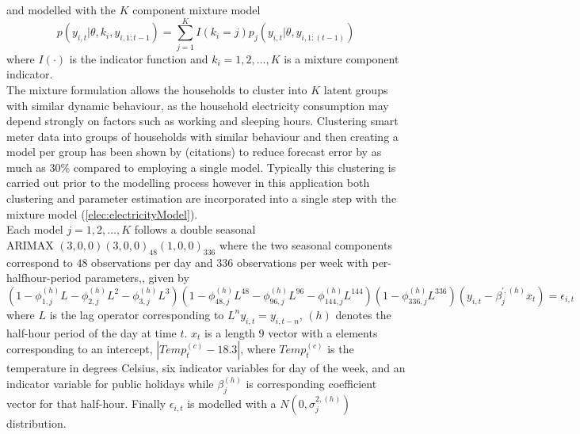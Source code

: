 \documentclass[
12pt, %
onehalfspacing, %
nohyperref, %
headsepline, %
chapterinoneline, %
]{MastersDoctoralThesis} %
\begin{document}
and modelled with the $K$ component mixture model
\begin{equation}
\label{elec:electricityModel}
p(y_{i, t} | \theta, k_i, y_{i, 1:t-1}) = \sum_{j=1}^K I(k_{i} = j) p_{j}(y_{i, t} | \theta, y_{i, 1:(t-1)})
\end{equation}
where $I(\cdot)$ is the indicator function and $k_i = 1, 2, \ldots, K$ is a mixture component indicator.
\\

The mixture formulation allows the households to cluster into $K$ latent groups with similar dynamic behaviour, as the household electricity consumption may depend strongly on factors such as working and sleeping hours. Clustering smart meter data into groups of households with similar behaviour and then creating a model per group has been shown by (citations) to reduce forecast error by as much as 30\% compared to employing a single model. Typically this clustering is carried out prior to the modelling process however in this application both clustering and parameter estimation are incorporated into a single step with the mixture model (\ref{elec:electricityModel}).
\\

Each model $j = 1, 2, \ldots, K$ follows a double seasonal \\ ARIMAX $(3, 0, 0)(3, 0, 0)_{48}(1, 0, 0)_{336}$ where the two seasonal components correspond to $48$ observations per day and $336$ observations per week with per-halfhour-period parameters,, given by
\begin{equation}
\label{elec:dynamic}
(1 - \phi_{1, j}^{(h)}L - \phi_{2, j}^{(h)}L^2 - \phi_{3, j}^{(h)} L^3)(1 - \phi_{48, j}^{(h)}L^{48} - \phi_{96, j}^{(h)}L^{96} - \phi_{144, j}^{(h)}L^{144})(1 - \phi_{336, j}^{(h)}L^{336}) (y_{i, t} -  \beta^{\prime, {(h)}}_{j} x_{t}) = \epsilon_{i, t}
\end{equation}
where $L$ is the lag operator corresponding to $L^n y_{i, t} = y_{i, t- n}$, $(h)$ denotes the half-hour period of the day at time $t$. $x_{t}$ is a length $9$ vector with a elements corresponding to an intercept, $|Temp^{(c)}_{t} - 18.3|$, where $Temp^{(c)}_{t}$ is the temperature in degrees Celsius, six indicator variables for day of the week, and an indicator variable for public holidays while $\beta_{j}^{(h)}$ is corresponding coefficient vector for that half-hour. Finally $\epsilon_{i, t}$ is modelled with a $N(0, \sigma^{2, (h)}_{j})$ distribution.
\\
\end{document}
